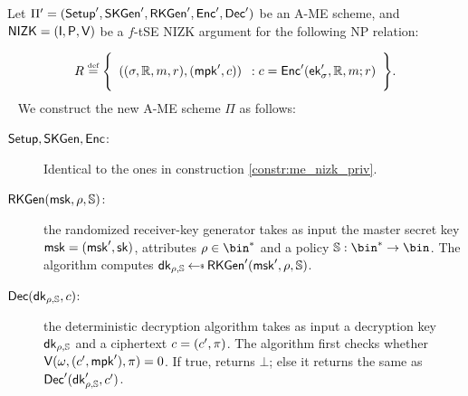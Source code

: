 \begin{construction}\label{constr:ame_nizk_priv}
    Let $\Pi'=(\mathsf{Setup}',\mathsf{SKGen}',\mathsf{RKGen}', \mathsf{Enc}',\mathsf{Dec}')$ be an A-ME scheme, and $\mathsf{NIZK}=(\mathsf{I}, \mathsf{P}, \mathsf{V})$ be a $f$-tSE NIZK argument for the following NP relation:

    \[
        R \eqdef \Biggl\{ \begin{array}{c}((\sattr, \raccess, \msg, r),(\mpk', \cipher))\end{array}:\begin{array}{@{}c}
            \cipher = \enc'(\ek'_\sattr, \raccess, \msg; r)
        \end{array} \Biggr\}.
    \]
    ~\newline\newline
    We construct the new A-ME scheme $\Pi$ as follows:
    \begin{description}
        \item[$\mathsf{Setup}, \mathsf{SKGen},\mathsf{Enc}$:] Identical to the ones in construction \ref{constr:me_nizk_priv}.
        \item[$\mathsf{RKGen}(\mathsf{msk}, \rho, \mathbb{S})$:] the randomized receiver-key generator takes as input the master secret key $\mathsf{msk} = (\mathsf{msk}', \mathsf{sk})$, attributes $\rattr \in \bin^*$ and a policy $\saccess:\bin^* \to \bin$. The algorithm computes $\dk_{\rattr, \saccess} \getsr \rkgen'(\msk', \rattr, \saccess)$.
        \item[$\mathsf{Dec}(\mathsf{dk}_{\rho, \mathbb{S}}, c)$:] the deterministic decryption algorithm takes as input a decryption key $\mathsf{dk}_{\rho, \mathbb{S}}$ and a ciphertext $c = (c', \pi)$. The algorithm first checks whether $\mathsf{V}(\omega, (c', \mathsf{mpk}'), \pi) = 0$. If true, returns $\bot$; else it returns the same as $\mathsf{Dec}'(\mathsf{dk}'_{\rho, \mathbb{S}}, c')$.
    \end{description}
\end{construction}